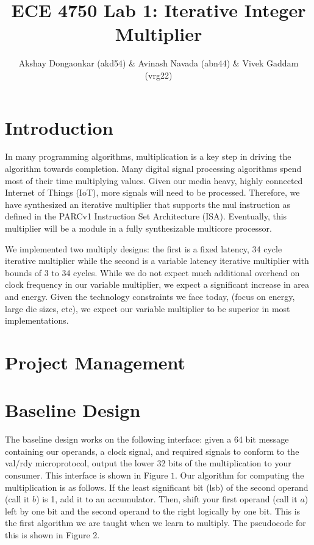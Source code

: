 \documentclass[11pt]{article}
\begin{document}
\title{ECE 4750 Lab 1: Iterative Integer Multiplier}
\author{Akshay Dongaonkar (akd54) \& Avinash Navada (abn44) \& Vivek Gaddam (vrg22)}
\maketitle

\section{Introduction}

In many programming algorithms, multiplication is a key step in driving the algorithm towards completion. 
Many digital signal processing algorithms spend most of their time multiplying values. 
Given our media heavy, highly connected Internet of Things (IoT), more signals will need to be processed.
Therefore, we have synthesized an iterative multiplier that supports the mul instruction as defined in the PARCv1 Instruction Set Architecture (ISA).
Eventually, this multiplier will be a module in a fully synthesizable multicore processor.

We implemented two multiply designs: the first is a fixed latency, 34 cycle iterative multiplier while the second is a variable latency
iterative multiplier with bounds of 3 to 34 cycles.
While we do not expect much additional overhead on clock frequency in our variable multiplier,
we expect a significant increase in area and energy.
Given the technology constraints we face today, (focus on energy, large die sizes, etc),
we expect our variable multiplier to be superior in most implementations. 


\section{Project Management}

\section{Baseline Design}

The baseline design works on the following interface: 
given a 64 bit message containing our operands, a clock signal,
and required signals to conform to the val/rdy microprotocol,
output the lower 32 bits of the multiplication to your consumer.
This interface is shown in Figure $1$.
Our algorithm for computing the multiplication is as follows.
If the least significant bit (lsb) of the second operand (call it $b$) is 1, add it to an accumulator.
Then, shift your first operand (call it $a$) left by one bit and the second operand to the right logically by one bit.
This is the first algorithm we are taught when we learn to multiply.
The pseudocode for this is shown in Figure 2. 
\end{document}
